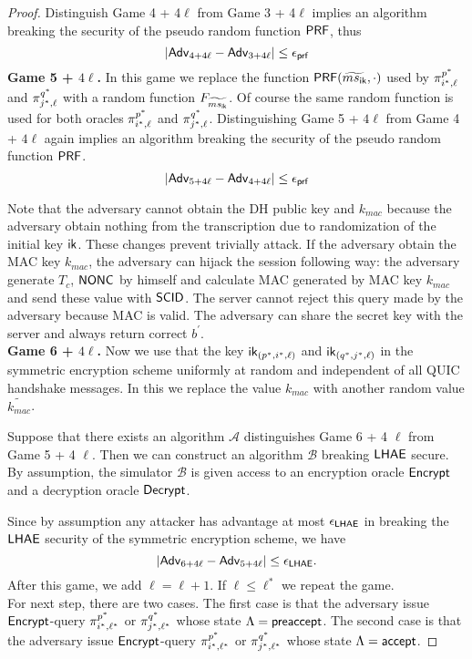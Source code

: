 \begin{proof}
 Distinguish Game 4 + 4$\ell$ from Game 3 + 4$\ell$ implies an algorithm breaking the security of the pseudo random function $\mathsf{PRF}$, thus
 \begin{equation}
  |\mathsf{Adv}_{4 + 4\ell} - \mathsf{Adv}_{3 + 4\ell}| \leq \epsilon_{\mathsf{prf}}
 \end{equation}%
%
%
 \textbf{Game 5 + $4\ell$.} In this game we replace the function $\mathsf{PRF}(\widetilde{ms_{\mathsf{ik}}}, \cdot)$ used by $\pi^{p^{\ast}}_{i^{\ast},\ell}$ and $\pi^{q^{\ast}}_{j^{\ast},\ell}$ with a random function $F_{\widetilde{ms_{\mathsf{ik}}}}$. Of course the same random function is used for both oracles $\pi^{p^{\ast}}_{i^{\ast},\ell}$ and $\pi^{q^{\ast}}_{j^{\ast},\ell}$. Distinguishing Game 5 + $4\ell$ from Game 4 + $4\ell$ again implies an algorithm breaking the security of the pseudo random function $\mathsf{PRF}$.
 \begin{equation}
  |\mathsf{Adv}_{5 + 4\ell} - \mathsf{Adv}_{4 + 4\ell}| \leq \epsilon_{\mathsf{prf}}
 \end{equation}%

 Note that the adversary cannot obtain the DH public key and $k_{mac}$ because the adversary obtain nothing from the transcription due to randomization of the initial key $\mathsf{ik}$. These changes prevent trivially attack. If the adversary obtain the MAC key $k_{mac}$, the adversary can hijack the session following way: the adversary generate $T_c$, $\mathsf{NONC}$ by himself and calculate MAC generated by MAC key $k_{mac}$ and send these value with $\mathsf{SCID}$. The server cannot reject this query made by the adversary because MAC is valid. The adversary can share the secret key with the server and always return correct $b^{\prime}$.
\vspace{10pt}\\%
%
%
 \textbf{Game 6 + $4\ell$.} Now we use that the key $\mathsf{ik}_{(p^{\ast}, i^{\ast}, \ell)}$ and $\mathsf{ik}_{(q^{\ast}, j^{\ast}, \ell)}$ in the symmetric encryption scheme uniformly at random and independent of all QUIC handshake messages. In this we replace the value $k_{mac}$ with another random value $\widetilde{k_{mac}}$.

 Suppose that there exists an algorithm $\mathcal{A}$ distinguishes Game 6 + 4 $\ell$ from Game 5 + 4 $\ell$. Then we can construct an algorithm $\mathcal{B}$ breaking $\mathsf{LHAE}$ secure. By assumption, the simulator $\mathcal{B}$ is given access to an encryption oracle $\mathsf{Encrypt}$ and a decryption oracle $\mathsf{Decrypt}$.

 Since by assumption any attacker has advantage at most $\epsilon_{\mathsf{LHAE}}$ in breaking the $\mathsf{LHAE}$ security of the symmetric encryption scheme, we have
 \begin{equation}
  |\mathsf{Adv}_{6 + 4\ell} - \mathsf{Adv}_{5 + 4\ell}| \leq \epsilon_{\mathsf{LHAE}}.
 \end{equation}%
 After this game, we add $\ell = \ell + 1$. If $\ell \leq \ell^{\ast}$ we repeat the game.
\vspace{10pt}\\%
%
%
 For next step, there are two cases. The first case is that the adversary issue $\mathsf{Encrypt}$-query $\pi^{p^{\ast}}_{i^{\ast},\ell^{\ast}}$ or $\pi^{q^{\ast}}_{j^{\ast},\ell^{\ast}}$ whose state $\Lambda = \mathsf{preaccept}$. The second case is that the adversary issue $\mathsf{Encrypt}$-query $\pi^{p^{\ast}}_{i^{\ast},\ell^{\ast}}$ or $\pi^{q^{\ast}}_{j^{\ast},\ell^{\ast}}$ whose state $\Lambda = \mathsf{accept}$.


\end{proof}
